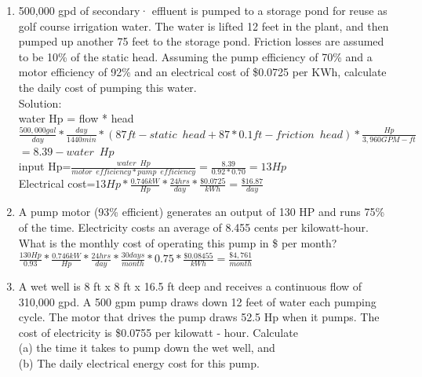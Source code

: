 \documentclass{article}
\begin{document}
\begin{enumerate}
\pagebreak

\item 500,000 gpd of secondary· effluent is pumped to  a  storage  pond  for  reuse  as golf course irrigation water.  The water is lifted 12 feet in the plant, and then pumped up another 75 feet to the storage pond. Friction losses are assumed to be 10\% of the static head.  Assuming the pump efficiency of 70\% and a motor efficiency of 92\% and an electrical cost of \$0.0725 per KWh, calculate the daily cost of pumping this water.\\
\vspace{0.4cm}
Solution:\\

water Hp = flow * head\\
\vspace{0.4cm}
$\frac{500,000gal}{day}*\frac{day}{1440min}*(87ft-static \enspace head+87*0.1ft-friction \enspace head)*\frac{Hp}{3,960 GPM-ft}$\\
$=8.39 - water \enspace Hp$\\
\vspace{0.4cm}
input Hp=$\frac{water \enspace Hp}{motor \enspace efficiency*pump \enspace efficiency}=\frac{8.39}{0.92*0.70}=\boxed{13Hp}$\\
\vspace{0.4cm}
Electrical cost=$13Hp*\frac{0.746kW}{Hp}*\frac{24hrs}{day}*\frac{\$0.0725}{kWh}=\boxed{\frac{\$16.87}{day}}$

\vspace{0.4cm}


\item A pump motor (93\% efficient) generates an output of 130 HP and runs 75\% of the time. Electricity costs an average of 8.455 cents per kilowatt-hour. What is the monthly cost of operating this pump in \$ per month?\\
\vspace{0.4cm}
$\frac{130Hp}{0.93}*\frac{0.746kW}{Hp}*\frac{24hrs}{day}*\frac{30days}{month}*0.75*\frac{\$0.08455}{kWh}=\boxed{\frac{\$4,761}{month}}$
\pagebreak


\item A wet well is 8 ft x 8 ft x 16.5 ft deep and receives a continuous flow of 310,000 gpd.  A 500 gpm pump draws down 12 feet of water each pumping cycle.  The motor that drives the pump draws 52.5 Hp when it pumps.  The cost of electricity is \$0.0755 per kilowatt - hour.  Calculate\\ 
(a) the time it takes to pump down the wet well, and\\
(b) The daily electrical energy cost for this pump.\\



\end{enumerate}
\end{document}
